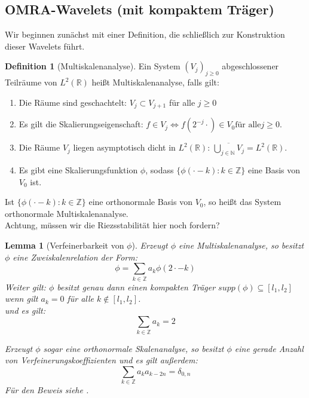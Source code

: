 \documentclass[11pt,a4paper,titlepage]{article}
\theoremstyle{plain} %
\newtheorem{lemma}[satz]{Lemma}
\theoremstyle{definition} %
\newtheorem{definition}[satz]{Definition}
\numberwithin{equation}{section} %
\begin{document}
		\subsection{OMRA-Wavelets (mit kompaktem Träger)}
		\label{OMRA}
		Wir beginnen zunächst mit einer Definition, die schließlich zur Konstruktion dieser Wavelets führt.
		\begin{definition}[Multiskalenanalyse]
			Ein System $(V_j)_{j\ge 0}$ abgeschlossener Teilräume von $L^2(\mathbb{R})$ heißt Multiskalenanalyse, falls gilt:
			\begin{enumerate}
				\item Die Räume sind geschachtelt:  $V_j\subset V_{j+1}$ für alle $j\ge0$
				\item Es gilt die Skalierungseigenschaft: $f\in V_j \Leftrightarrow f(2^{-j} \cdot) \in V_0 \text{für alle} j\ge 0$.
				\item Die Räume $V_j$ liegen asymptotisch dicht in $L^2(\mathbb{R})$: $\overline{\bigcup_{j\in \mathbb{N}}V_j}=L^2(\mathbb{R})$.
				\item Es gibt eine Skalierungsfunktion $\phi$, sodass $\{\phi(\cdot-k):k\in \mathbb{Z}\}$ eine Basis von $V_0$ ist.
			\end{enumerate}
			Ist  $\{\phi(\cdot-k):k\in \mathbb{Z}\}$ eine orthonormale Basis von $V_0$, so heißt das System orthonormale Multiskalenanalyse.\\
			Achtung, müssen wir die Riezsstabilität hier noch fordern?
		\end{definition}
		
		\begin{lemma}[Verfeinerbarkeit von $\phi$]
			Erzeugt $\phi$ eine Multiskalenanalyse, so besitzt $\phi$ eine Zweiskalenrelation der Form:
			\begin{equation}
				\phi = \sum_{k\in \mathbb{Z}}a_k \phi(2\cdot -k)
			\end{equation}
			Weiter gilt: $\phi$ besitzt genau dann einen kompakten Träger $supp(\phi) \subseteq [l_1, l_2]$ wenn gilt $a_k=0$ für alle $k\notin [l_1,l_2]$. \\
			und es gilt:
			\begin{equation}
			\label{SummeDerKoeffizienten}
			\sum_{k\in \mathbb{Z}}a_k = 2
			\end{equation}
			 
			Erzeugt $\phi$ sogar eine orthonormale Skalenanalyse, so besitzt $\phi$ eine gerade Anzahl von Verfeinerungskoeffizienten und es gilt außerdem: 
			\begin{equation}
			\label{ProduktDerKoeffizienten}
			\sum_{k\in \mathbb{Z}}a_k a_{k-2n}=\delta_{0,n}
			\end{equation}	
			Für den Beweis siehe \cite{Daubechies1992}.
		\end{lemma}
	
\end{document}
